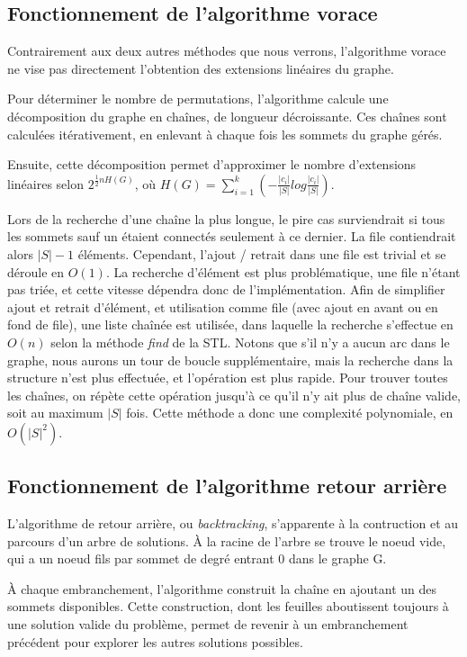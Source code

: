 \documentclass[10pt,a4paper]{article}
\begin{document}
\subsection{Fonctionnement de l'algorithme vorace}

Contrairement aux deux autres méthodes que nous verrons, l'algorithme vorace ne vise pas directement l'obtention des extensions linéaires du graphe. 

Pour déterminer le nombre de permutations, l'algorithme calcule une décomposition du graphe en chaînes, de longueur décroissante. Ces chaînes sont calculées itérativement, en enlevant à chaque fois les sommets du graphe gérés.

Ensuite, cette décomposition permet d'approximer le nombre d'extensions linéaires selon $ 2^{ \frac{1}{2} n H(G)} $, où $ H(G) = \sum_{i=1}^{k} (- \frac{|c_{i}|}{|S|} log \frac{|c_{i}|}{|S|} ) $.

Lors de la recherche d'une chaîne la plus longue, le pire cas surviendrait si tous les sommets sauf un étaient connectés seulement à ce dernier. La file contiendrait alors $ |S| - 1 $ éléments. Cependant, l'ajout / retrait dans une file est trivial et se déroule en $ O(1) $. La recherche d'élément est plus problématique, une file n'étant pas triée, et cette vitesse dépendra donc de l'implémentation. Afin de simplifier ajout et retrait d'élément, et utilisation comme file (avec ajout en avant ou en fond de file), une liste chaînée est utilisée, dans laquelle la recherche s'effectue en $ O(n) $ selon la méthode \textit{find} de la STL.
Notons que s'il n'y a aucun arc dans le graphe, nous aurons un tour de boucle supplémentaire, mais la recherche dans la structure n'est plus effectuée, et l'opération est plus rapide. Pour trouver toutes les chaînes, on répète cette opération jusqu'à ce qu'il n'y ait plus de chaîne valide, soit au maximum $ |S| $ fois.
Cette méthode a donc une complexité polynomiale, en $ O(|S|^{2}) $.

\subsection{Fonctionnement de l'algorithme retour arrière}

L'algorithme de retour arrière, ou \textit{backtracking}, s'apparente à la contruction et au parcours d'un arbre de solutions. À la racine de l'arbre se trouve le noeud vide, qui a un noeud fils par sommet de degré entrant 0 dans le graphe G.

À chaque embranchement, l'algorithme construit la chaîne en ajoutant un des sommets disponibles. Cette construction, dont les feuilles aboutissent toujours à une solution valide du problème, permet de revenir à un embranchement précédent pour explorer les autres solutions possibles.
\end{document}
